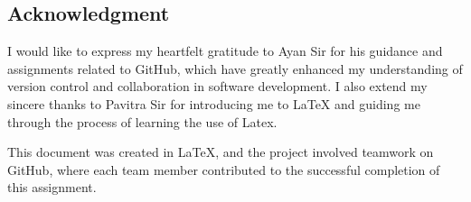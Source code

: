 
\begin{mdframed}[linecolor=white]
    
\section*{Acknowledgment}

I would like to express my heartfelt gratitude to Ayan Sir for his guidance and assignments related to GitHub, which have greatly enhanced my understanding of version control and collaboration in software development. I also extend my sincere thanks to Pavitra Sir for introducing me to LaTeX and guiding me through the process of learning the use of Latex.

This document was created in LaTeX, and the project involved teamwork on GitHub, where each team member contributed to the successful completion of this assignment.

\vspace{2cm}

\noindent\makebox[\textwidth][r]{\underline{\hspace{5cm}}} 
\noindent{} 

\end{mdframed}